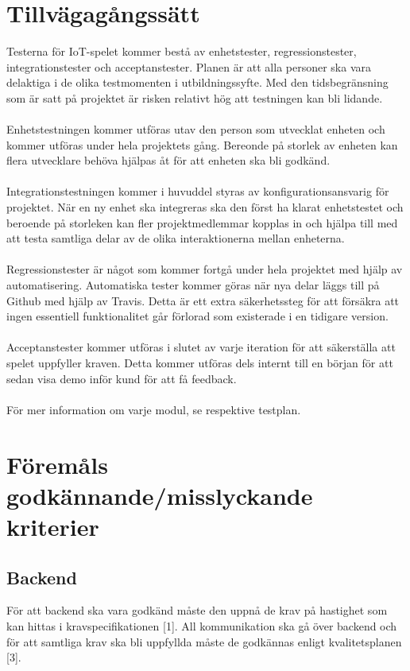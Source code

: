 \documentclass[10pt]{article}
\begin{document}
\section{Tillvägagångssätt}
	Testerna för IoT-spelet kommer bestå av enhetstester, regressionstester, integrationstester och acceptanstester. Planen är att alla personer ska vara delaktiga i de olika 		testmomenten i utbildningssyfte. Med den tidsbegränsning som är satt på projektet är risken relativt hög att testningen kan bli lidande. \\
	\\
	Enhetstestningen kommer utföras utav den person som utvecklat enheten och kommer utföras under hela projektets gång. Bereonde på storlek av enheten kan flera utvecklare behöva hjälpas åt för att enheten ska bli godkänd.\\
	\\
	Integrationstestningen kommer i huvuddel styras av konfigurationsansvarig för projektet. När en ny enhet ska integreras ska den först ha klarat enhetstestet och beroende på storleken kan fler projektmedlemmar kopplas in och hjälpa till med att testa samtliga delar av de olika interaktionerna mellan enheterna. \\
	\\
	Regressionstester är något som kommer fortgå under hela projektet med hjälp av automatisering. Automatiska tester kommer göras när nya delar läggs till på Github med hjälp av {\color{red}Travis}. Detta är ett extra säkerhetssteg för att försäkra att ingen essentiell funktionalitet går förlorad som existerade i en tidigare version.\\
	\\
	Acceptanstester kommer utföras i slutet av varje iteration för att säkerställa att spelet uppfyller kraven. Detta kommer utföras dels internt till en början för att sedan visa demo inför kund för att få feedback.  \\ 
	\\
	För mer information om varje modul, se respektive testplan.
	
	

\section{Föremåls godkännande/misslyckande kriterier}
	\subsection{Backend}
		För att backend ska vara godkänd måste den uppnå de krav på hastighet som kan hittas i kravspecifikationen {\color{red}[1]}. All kommunikation ska gå över backend och för att samtliga krav ska bli uppfyllda måste de godkännas enligt kvalitetsplanen  {\color{red}[3]}.
\end{document}
